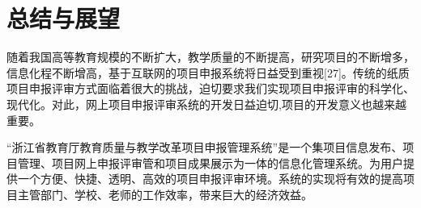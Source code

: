
\chapter{总结与展望}
随着我国高等教育规模的不断扩大，教学质量的不断提高，研究项目的不断增多，信息化程不断增高，基于互联网的项目申报系统将日益受到重视[27]。传统的纸质项目申报评审方式面临着很大的挑战，迫切要求我们实现项目申报评审的科学化、现代化。对此，网上项目申报评审系统的开发日益迫切,项目的开发意义也越来越重要。

	“浙江省教育厅教育质量与教学改革项目申报管理系统”是一个集项目信息发布、项目管理、项目网上申报评审管和项目成果展示为一体的信息化管理系统。为用户提供一个方便、快捷、透明、高效的项目申报评审环境。系统的实现将有效的提高项目主管部门、学校、老师的工作效率，带来巨大的经济效益。
